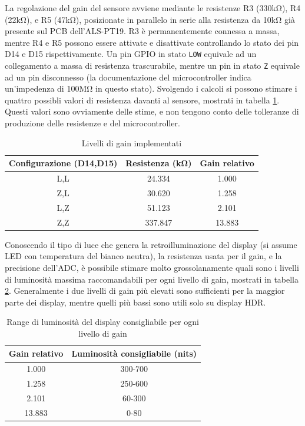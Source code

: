 La regolazione del gain del sensore avviene mediante le resistenze R3 (330k\si{\ohm}), R4 (22k\si{\ohm}), e R5 (47k\si{\ohm}), posizionate in parallelo in serie alla resistenza da 10k\si{\ohm} già presente sul PCB dell'ALS-PT19. R3 è permanentemente connessa a massa, mentre R4 e R5 possono essere attivate e disattivate controllando lo stato dei pin D14 e D15 rispettivamente. Un pin GPIO in stato \texttt{LOW} equivale ad un collegamento a massa di resistenza trascurabile, mentre un pin in stato \texttt{Z} equivale ad un pin disconnesso (la documentazione del microcontroller indica un'impedenza di 100M\si{\ohm} in questo stato). Svolgendo i calcoli si possono stimare i quattro possibli valori di resistenza davanti al sensore, mostrati in tabella \ref{tab:pt19_gains}. Questi valori sono ovviamente delle stime, e non tengono conto delle tolleranze di produzione delle resistenze e del microcontroller.
\begin{table}
	\centering
	\begin{tabular}{|c|c|c|} 
		\hline
		\textbf{Configurazione (D14,D15)} & \textbf{Resistenza (k\si{\ohm})} & \textbf{Gain relativo}  \\ 
		\hline
		L,L & 24.334   & 1.000         \\ 
		\hline
		Z,L & 30.620   & 1.258         \\ 
		\hline
		L,Z & 51.123   & 2.101         \\ 
		\hline
		Z,Z & 337.847    & 13.883          \\
		\hline
	\end{tabular}
	\caption{\label{tab:pt19_gains}Livelli di gain implementati}
\end{table}

Conoscendo il tipo di luce che genera la retroilluminazione del display (si assume LED con temperatura del bianco neutra), la resistenza usata per il gain, e la precisione dell'ADC, è possibile stimare molto grossolanamente quali sono i livelli di luminosità massima raccomandabili per ogni livello di gain, mostrati in tabella \ref{tab:pt19_nits}. Generalmente i due livelli di gain più elevati sono sufficienti per la maggior parte dei display, mentre quelli più bassi sono utili solo su display HDR.
\begin{table}
	\centering
	\begin{tabular}{|c|c|} 
		\hline
		\textbf{Gain relativo} & \textbf{Luminosità consigliabile (nits)}  \\ 
		\hline
		1.000 & 300-700         \\ 
		\hline
		1.258 & 250-600         \\ 
		\hline
		2.101 & 60-300         \\ 
		\hline
		13.883 & 0-80          \\
		\hline
	\end{tabular}
	\caption{\label{tab:pt19_nits}Range di luminosità del display consigliabile per ogni livello di gain}
\end{table}

